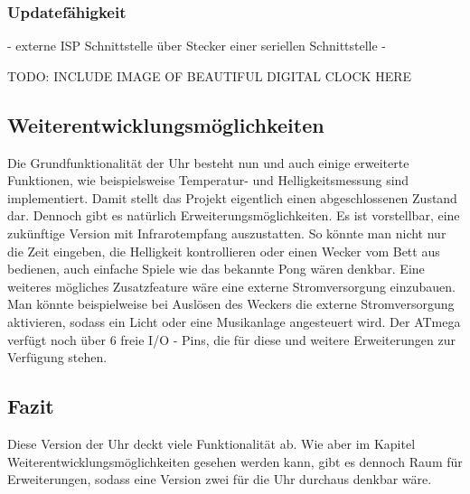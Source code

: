 \subsubsection{Updatefähigkeit}
- externe ISP Schnittstelle über Stecker einer seriellen Schnittstelle 
- 

TODO: INCLUDE IMAGE OF BEAUTIFUL DIGITAL CLOCK HERE


\subsection{Weiterentwicklungsmöglichkeiten}
Die Grundfunktionalität der Uhr besteht nun und auch einige erweiterte
Funktionen, wie beispielsweise Temperatur- und Helligkeitsmessung sind
implementiert. Damit stellt das Projekt eigentlich einen abgeschlossenen Zustand
dar. Dennoch gibt es natürlich Erweiterungsmöglichkeiten. Es ist vorstellbar,
eine zukünftige Version mit Infrarotempfang auszustatten. So könnte man nicht
nur die Zeit eingeben, die Helligkeit kontrollieren oder einen Wecker vom Bett
aus bedienen, auch einfache Spiele wie das bekannte Pong wären denkbar. Eine
weiteres mögliches Zusatzfeature wäre eine externe Stromversorgung einzubauen.
Man könnte beispielweise bei Auslösen des Weckers die externe Stromversorgung
aktivieren, sodass ein Licht oder eine Musikanlage angesteuert wird. Der ATmega
verfügt noch über 6 freie I/O - Pins, die für diese und weitere Erweiterungen
zur Verfügung stehen.

%
\subsection{Fazit}
Diese Version der Uhr deckt viele Funktionalität ab. Wie aber im Kapitel Weiterentwicklungsmöglichkeiten gesehen werden kann, gibt es dennoch Raum für Erweiterungen, sodass eine Version zwei für die Uhr durchaus denkbar wäre.
